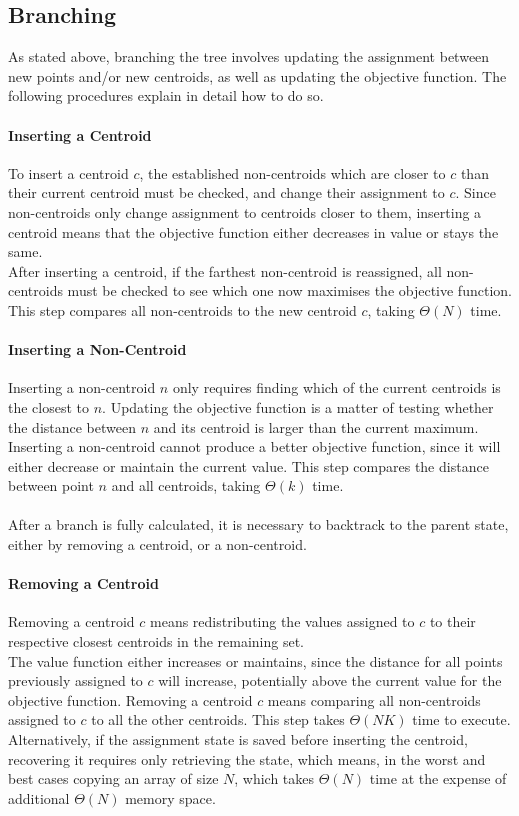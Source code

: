 \subsection{Branching}

As stated above, branching the tree involves updating the assignment between new points and/or new centroids, as well as updating the objective function. The following procedures explain in detail how to do so.
\paragraph{Inserting a Centroid}
To insert a centroid $c$, the established non-centroids which are closer to $c$ than their current centroid must be checked, and change their assignment to $c$.
Since non-centroids only change assignment to centroids closer to them, inserting a centroid means that the objective function either decreases in value or stays the same.\\
After inserting a centroid, if the farthest non-centroid is reassigned, all non-centroids must be checked to see which one now maximises the objective function.
This step compares all non-centroids to the new centroid $c$, taking $\Theta(N)$ time.

\paragraph{Inserting a Non-Centroid}
Inserting a non-centroid $n$ only requires finding which of the current centroids is the closest to $n$. Updating the objective function is a matter of testing whether the distance between $n$ and its centroid is larger than the current maximum.
Inserting a non-centroid cannot produce a better objective function, since it will either decrease or maintain the current value. 
This step compares the distance between point $n$ and all centroids, taking $\Theta(k)$ time.
\paragraph{}
After a branch is fully calculated, it is necessary to backtrack to the parent state, either by removing a centroid, or a non-centroid.
\paragraph{Removing a Centroid}
Removing a centroid $c$ means redistributing the values assigned to $c$ to their respective closest centroids in the remaining set. \\
The value function either increases or maintains, since the distance for all points previously assigned to $c$ will increase, potentially above the current value for the objective function.
Removing a centroid $c$ means comparing all non-centroids assigned to $c$ to all the other centroids. This step takes $\Theta(NK)$ time to execute. Alternatively, if the assignment state is saved before inserting the centroid, recovering it requires only retrieving the state, which means, in the worst and best cases copying an array of size $N$, which takes $\Theta(N)$ time at the expense of additional $\Theta(N)$ memory space.

